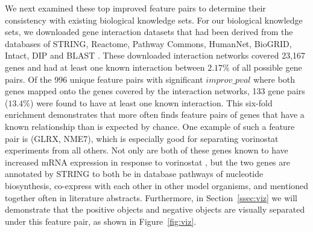 We next examined these  top improved feature pairs to determine their consistency with existing biological knowledge sets. For our biological knowledge sets, we downloaded gene interaction datasets that had been derived from the databases of STRING, Reactome, Pathway Commons, HumanNet, BioGRID, Intact, DIP and BLAST \needcite{} . These downloaded interaction networks covered 23,167 genes and had at least one known interaction between $2.17\%$ of all possible gene pairs. Of the 996 unique feature pairs with significant $improv\_pval$ where both genes mapped onto the genes covered by the interaction networks, 133 gene pairs ($13.4\%$) were found to have at least one known interaction. This six-fold enrichment demonstrates that \genviz {} more often finds feature pairs of genes that have a known relationship than is expected by chance. One example of such a feature pair is (GLRX, NME7), which is especially good  for separating vorinostat experiments from all others. Not only are both of these genes known to have increased mRNA expression in response to vorinostat , but the two genes are annotated by STRING to both be in database pathways of nucleotide biosynthesis, co-express with each other in other model organisms, and mentioned together often in literature abstracts.  Furthermore,  in Section~\ref{ssec:viz} we will demonstrate that the positive objects and negative objects are visually separated under this feature pair, as shown in Figure~\ref{fig:viz}.

